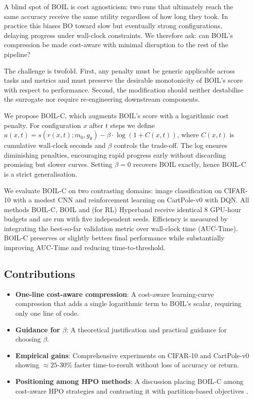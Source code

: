 \documentclass{article} %
\begin{document}
A blind spot of BOIL is cost agnosticism: two runs that ultimately reach the same accuracy receive the same utility regardless of how long they took. In practice this biases BO toward slow but eventually strong configurations, delaying progress under wall-clock constraints. We therefore ask: can BOIL's compression be made cost-aware with minimal disruption to the rest of the pipeline?

The challenge is twofold. First, any penalty must be generic applicable across tasks and metrics and must preserve the desirable monotonicity of BOIL's score with respect to performance. Second, the modification should neither destabilise the surrogate nor require re-engineering downstream components.

We propose BOIL-C, which augments BOIL's score with a logarithmic cost penalty. For configuration \(x\) after \(t\) steps we define
\(u(x,t)=s(r(x,t);m_0,g_0)-\beta\cdot\log(1+C(x,t))\),
where \(C(x,t)\) is cumulative wall-clock seconds and \(\beta\) controls the trade-off. The log ensures diminishing penalties, encouraging rapid progress early without discarding promising but slower curves. Setting \(\beta=0\) recovers BOIL exactly, hence BOIL-C is a strict generalisation.

We evaluate BOIL-C on two contrasting domains: image classification on CIFAR-10 with a modest CNN and reinforcement learning on CartPole-v0 with DQN. All methods BOIL-C, BOIL and (for RL) Hyperband receive identical 8 GPU-hour budgets and are run with five independent seeds. Efficiency is measured by integrating the best-so-far validation metric over wall-clock time (AUC-Time). BOIL-C preserves or slightly betters final performance while substantially improving AUC-Time and reducing time-to-threshold.

\subsection{Contributions}
\begin{itemize}
  \item \textbf{One-line cost-aware compression}: A cost-aware learning-curve compression that adds a single logarithmic term to BOIL's scalar, requiring only one line of code.
  \item \textbf{Guidance for \(\beta\)}: A theoretical justification and practical guidance for choosing \(\beta\).
  \item \textbf{Empirical gains}: Comprehensive experiments on CIFAR-10 and CartPole-v0 showing \(\approx 25\text{-}30\%\) faster time-to-result without loss of accuracy or return.
  \item \textbf{Positioning among HPO methods}: A discussion placing BOIL-C among cost-aware HPO strategies and contrasting it with partition-based objectives \cite{mlodozeniec-2023-hyperparameter}.
\end{itemize}
\end{document}
